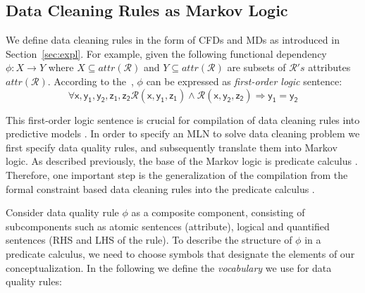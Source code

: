 \subsection{Data Cleaning Rules as Markov Logic}
\label{sec:ml}
We define data cleaning rules in the form of CFDs and MDs as introduced in Section~\ref{sec:expl}. For example, given the following functional dependency $\phi: X \rightarrow Y$ where $X \subseteq attr(\mathcal{R}) $ and $Y \subseteq attr(\mathcal{R}) $ are subsets of $\mathcal{R}'s$ attributes $attr(\mathcal{R})$. According to the~\cite{Fagin:1982:HCD:322344.322347}, $\phi$ can be expressed as \textit{first-order logic} sentence:
\begin{equation}
\mathsf{\forall x, y_1, y_2, z_1, z_2 \mathcal{R}(x, y_1, z_1) \wedge \mathcal{R}(x, y_2, z_2) \Rightarrow y_1=y_2}
\label{fd2fol}
\end{equation}

This first-order logic sentence is crucial for compilation of data cleaning rules into predictive models . In order to specify an MLN to solve data cleaning problem we first specify data quality rules, and subsequently translate them into Markov logic. As described previously, the base of the Markov logic is predicate calculus . Therefore, one important step is the generalization of the compilation from the formal constraint based data cleaning rules into the predicate calculus .

Consider data quality rule $\phi$ as a composite component, consisting of subcomponents such as atomic sentences (attribute), logical and quantified sentences (RHS and LHS of the rule). To describe the structure of $\phi$ in a predicate calculus, we need to choose symbols that designate the elements of our conceptualization. In the following we define the \textit{vocabulary} we use for data quality rules: 

